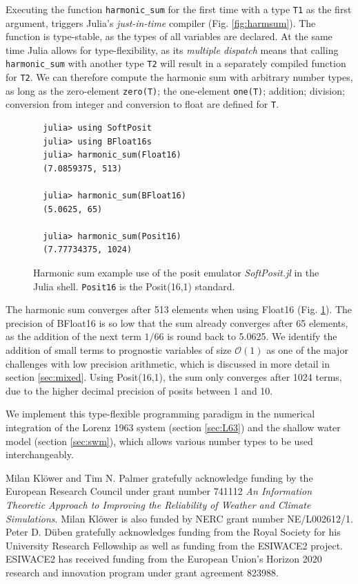 \documentclass[draft]{agujournal2019}
\begin{document}
Executing the function \texttt{harmonic\_sum} for the first time with a type \texttt{T1} as the first argument, triggers Julia's \emph{just-in-time} compiler (Fig. \ref{fig:harmsum}). The function is type-stable, as the types of all variables are declared. At the same time Julia allows for type-flexibility, as its \emph{multiple dispatch} means that calling \texttt{harmonic\_sum} with another type \texttt{T2} will result in a separately compiled function for \texttt{T2}. We can therefore compute the harmonic sum with arbitrary number types, as long as the zero-element \texttt{zero(T)}; the one-element \texttt{one(T)}; addition; division; conversion from integer and conversion to float are defined for \texttt{T}.

\begin{figure}[h]
\small
\begin{verbatim}
  julia> using SoftPosit
  julia> using BFloat16s
  julia> harmonic_sum(Float16)
  (7.0859375, 513)

  julia> harmonic_sum(BFloat16)
  (5.0625, 65)

  julia> harmonic_sum(Posit16)
  (7.77734375, 1024)
\end{verbatim}
\caption{Harmonic sum example use of the posit emulator \emph{SoftPosit.jl} in the Julia shell. \texttt{Posit16} is the Posit(16,1) standard.}
\label{fig:harmsum2}
\end{figure}

The harmonic sum converges after 513 elements when using Float16 (Fig. \ref{fig:harmsum2}). The precision of BFloat16 is so low that the sum already converges after 65 elements, as the addition of the next term $1/66$ is round back to 5.0625. We identify the addition of small terms to prognostic variables of size $\mathcal{O}(1)$ as one of the major challenges with low precision arithmetic, which is discussed in more detail in section \ref{sec:mixed}. Using Posit(16,1), the sum only converges after 1024 terms, due to the higher decimal precision of posits between 1 and 10.

We implement this type-flexible programming paradigm in the numerical integration of the Lorenz 1963 system (section \ref{sec:L63}) and the shallow water model (section \ref{sec:swm}), which allows various number types to be used interchangeably.


\acknowledgments
Milan Kl\"{o}wer and Tim N. Palmer gratefully acknowledge funding by the European Research Council under grant number 741112 \emph{An Information Theoretic Approach to Improving the Reliability of Weather and Climate Simulations}. Milan Kl\"{o}wer is also funded by NERC grant number NE/L002612/1.  Peter D. D\"{u}ben gratefully acknowledges funding from the Royal Society for his University Research Fellowship as well as funding from the ESIWACE2 project. ESIWACE2 has received funding from the European Union's Horizon 2020 research and innovation program under grant agreement 823988.


\end{document}
